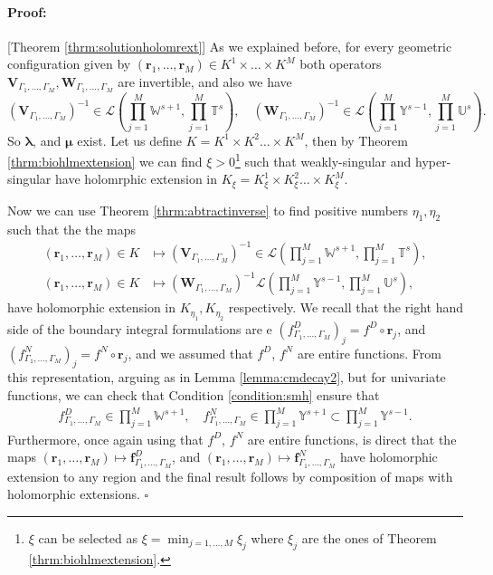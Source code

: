 \documentclass{article}
\newenvironment{proof}{\paragraph{Proof:}}{\hfill$\square$}
\newcommand{\bmu} {\bm{\mu}}
\newcommand{\IU}{{\mathbb U}}
\newcommand{\IT}{{\mathbb T}}
\newcommand{\IW}{{\mathbb W}}
\newcommand{\IY}{{\mathbb Y}}
\newcommand{\bla}{\boldsymbol \lambda}
\newcommand{\br}{\bm{r}}
\begin{document}
\begin{proof}[Theorem \ref{thrm:solutionholomrext}]
As we explained before, for every geometric configuration given by $(\br_1,\hdots, \br_M) \in K^1 \times \hdots \times K^M$ both operators $\mathbf{V}_{\Gamma_1,\hdots,\Gamma_M},
\mathbf{W}_{\Gamma_1,\hdots,\Gamma_M}$ are invertible, and also we have 
$$
(\mathbf{V}_{\Gamma_1,\hdots,\Gamma_M})^{-1} \in \mathcal{L} \left( \prod_{j=1}^M \IW^{s+1}, \prod_{j=1}^M \IT^s \right), \quad (\mathbf{W}_{\Gamma_1,\hdots,\Gamma_M})^{-1} \in \mathcal{L} \left( \prod_{j=1}^M \IY^{s-1}, \prod_{j=1}^M \IU^s \right).
$$
So $\bla$, and $\bmu$ exist.
Let us define $K = K^1\times K^2 \hdots \times K^M$, then by Theorem \ref{thrm:biohlmextension} we can find $\xi>0$\footnote{$\xi$ can be selected as $\xi =\min_{j=1,\hdots,M} \xi_j$ where $\xi_j$ are the ones of Theorem \ref{thrm:biohlmextension}.} such that weakly-singular and hyper-singular have holomrphic extension in $K_\xi = K^1_\xi \times K^2_\xi \hdots \times K^M_\xi$. 

Now we can use Theorem \ref{thrm:abtractinverse} to find positive numbers $\eta_1,\eta_2$ such that the the maps 
\begin{align*}
(\br_1,\hdots,\br_M) \in K &\mapsto (\mathbf{V}_{\Gamma_1,\hdots,\Gamma_M})^{-1} \in  \mathcal{L} \left( \prod_{j=1}^M \IW^{s+1}, \prod_{j=1}^M \IT^s \right),\\
(\br_1,\hdots,\br_M) \in K &\mapsto(\mathbf{W}_{\Gamma_1,\hdots,\Gamma_M})^{-1}\mathcal{L} \left( \prod_{j=1}^M \IY^{s-1}, \prod_{j=1}^M \IU^s \right),
\end{align*}
have holomorphic extension in $K_{\eta_1}, K_{\eta_2}$ respectively.
We recall that the right hand side of the boundary integral formulations are e $({f}^D_{\Gamma_1,\hdots,\Gamma_M})_j = f^D \circ \br_j$, and $({f}^N_{\Gamma_1,\hdots,\Gamma_M})_j = f^N \circ \br_j$, and we assumed that $f^D$, $f^N$ are entire functions. From this representation, arguing as in Lemma \ref{lemma:cmdecay2}, but for univariate functions, we can check that Condition \ref{condition:smh} ensure that 
\begin{align*}
{f}^D_{\Gamma_1,\hdots,\Gamma_M} \in \prod_{j=1}^M \IW^{s+1}, \quad {f}^N_{\Gamma_1,\hdots,\Gamma_M} \in \prod_{j=1}^M \IY^{s+1} \subset \prod_{j=1}^M \IY^{s-1}.
\end{align*}
Furthermore, once again using that $f^D$, $f^N$ are entire functions, is direct that the maps $(\br_1,\hdots,\br_M) \mapsto \mathbf{f}^D_{\Gamma_1,\hdots,\Gamma_M}$, and  $(\br_1,\hdots,\br_M) \mapsto \mathbf{f}^N_{\Gamma_1,\hdots,\Gamma_M}$ have holomorphic extension to any region and the final result follows by composition of maps with holomorphic extensions. 
\end{proof}
\end{document}
